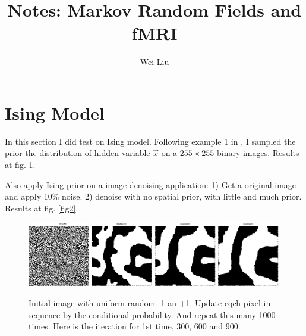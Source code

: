 \documentclass[12pt]{article}
\begin{document}
\title{Notes: Markov Random Fields and fMRI}
\author{Wei Liu}
\maketitle
\tableofcontents
\section{Ising Model}
In this section I did test on Ising model. Following example 1 in \cite{perez_markov_1998}, I sampled the prior the distribution of hidden variable $\vec x$ on a $255\times 255$ binary images. Results at fig. \ref{fig1}.

Also apply Ising prior on a image denoising application: 1) Get a original image and apply 10\% noise. 2) denoise with no spatial prior, with little and much prior. Results at fig. \ref{fig2}.

\begin{figure}[hbt]
\centering
\includegraphics[width = 0.24\textwidth]{figures/Ising1.eps} 
\includegraphics[width = 0.24\textwidth]{figures/Ising300.eps}
\includegraphics[width = 0.24\textwidth]{figures/Ising600.eps}
\includegraphics[width = 0.24\textwidth]{figures/Ising900.eps}

\caption{Initial image with uniform random -1 an +1. Update eqch pixel in sequence by the conditional probability. And repeat this many 1000 times. Here is the iteration for 1st time, 300, 600 and 900.}
\label{fig1}
\end{figure}
\end{document}

